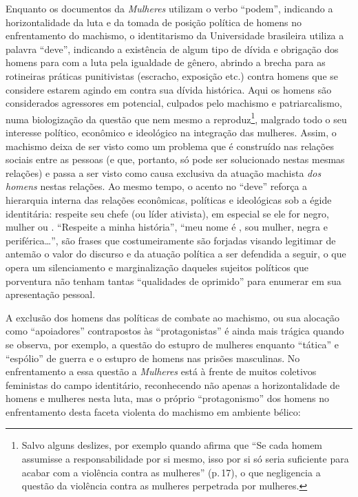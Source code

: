 Enquanto os documentos da \emph{ Mulheres} utilizam o verbo
``podem'', indicando a horizontalidade da luta e da tomada de posição
política de homens no enfrentamento do machismo, o identitarismo da
Universidade brasileira utiliza a palavra ``deve'', indicando a
existência de algum tipo de dívida e obrigação dos homens para com a
luta pela igualdade de gênero, abrindo a brecha para as rotineiras
práticas punitivistas (escracho, exposição etc.) contra homens que se
considere estarem agindo em contra sua dívida histórica. Aqui os homens
são considerados agressores em potencial, culpados pelo machismo e
patriarcalismo, numa biologização da questão que nem mesmo a 
reproduz\footnote{Salvo alguns deslizes, por exemplo quando afirma que
  ``Se cada homem assumisse a responsabilidade por si mesmo, isso por si
  só seria suficiente para acabar com a violência contra as mulheres''
  (p.\,17), o que negligencia a questão da violência contra as mulheres
  perpetrada por mulheres.}, malgrado todo o seu interesse político,
econômico e ideológico na integração das mulheres. Assim, o machismo
deixa de ser visto como um problema que é construído nas relações
sociais entre as pessoas (e que, portanto, só pode ser solucionado
nestas mesmas relações) e passa a ser visto como causa exclusiva da
atuação machista \emph{dos homens} nestas relações. Ao mesmo tempo, o
acento no ``deve'' reforça a hierarquia interna das relações econômicas,
políticas e ideológicas sob a égide identitária: respeite seu chefe (ou
líder ativista), em especial se ele for negro, mulher ou .
``Respeite a minha história'', ``meu nome é , sou mulher, negra e
periférica\ldots{}'', são frases que costumeiramente são forjadas visando
legitimar de antemão o valor do discurso e da atuação política a ser
defendida a seguir, o que opera um silenciamento e marginalização
daqueles sujeitos políticos que porventura não tenham tantas
``qualidades de oprimido'' para enumerar em sua apresentação pessoal.

A exclusão dos homens das políticas de combate ao machismo, ou sua
alocação como ``apoiadores'' contrapostos às ``protagonistas'' é ainda
mais trágica quando se observa, por exemplo, a questão do estupro de
mulheres enquanto ``tática'' e ``espólio'' de guerra e o estupro de
homens nas prisões masculinas. No enfrentamento a essa questão a
\emph{ Mulheres} está à frente de muitos coletivos feministas do
campo identitário, reconhecendo não apenas a horizontalidade de homens e
mulheres nesta luta, mas o próprio ``protagonismo'' dos homens no
enfrentamento desta faceta violenta do machismo em ambiente bélico:

